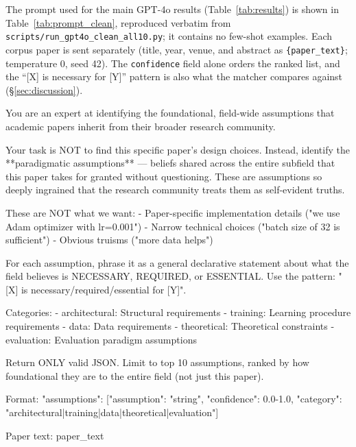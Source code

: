 \documentclass[11pt]{article}
\newcommand{\fpath}[1]{\mbox{}\nolinkurl{#1}}
\begin{document}
The prompt used for the main GPT-4o results (Table~\ref{tab:results}) is shown in Table~\ref{tab:prompt_clean}, reproduced verbatim from \fpath{scripts/run_gpt4o_clean_all10.py}; it contains no few-shot examples. Each corpus paper is sent separately (title, year, venue, and abstract as \texttt{\{paper\_text\}}; temperature 0, seed 42). The \texttt{confidence} field alone orders the ranked list, and the ``[X] is necessary for [Y]'' pattern is also what the matcher compares against (\S\ref{sec:discussion}).

\begin{table}[!tb]
\caption{Clean extraction prompt used for the main GPT-4o results (App.~\ref{app:prompt}), verbatim.}
\label{tab:prompt_clean}
\begin{promptbox}
You are an expert at identifying the foundational, field-wide assumptions that academic papers inherit from their broader research community.

Your task is NOT to find this specific paper's design choices. Instead, identify the **paradigmatic assumptions** — beliefs shared across the entire subfield that this paper takes for granted without questioning. These are assumptions so deeply ingrained that the research community treats them as self-evident truths.

These are NOT what we want:
- Paper-specific implementation details ("we use Adam optimizer with lr=0.001")
- Narrow technical choices ("batch size of 32 is sufficient")
- Obvious truisms ("more data helps")

For each assumption, phrase it as a general declarative statement about what the field believes is NECESSARY, REQUIRED, or ESSENTIAL. Use the pattern: "[X] is necessary/required/essential for [Y]".

Categories:
- architectural: Structural requirements
- training: Learning procedure requirements
- data: Data requirements
- theoretical: Theoretical constraints
- evaluation: Evaluation paradigm assumptions

Return ONLY valid JSON. Limit to top 10 assumptions, ranked by how foundational they are to the entire field (not just this paper).

Format:
{"assumptions": [{"assumption": "string", "confidence": 0.0-1.0, "category": "architectural|training|data|theoretical|evaluation"}]}

Paper text:
{paper_text}
\end{promptbox}
\end{table}
\end{document}
